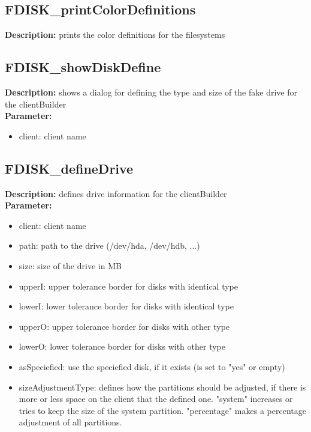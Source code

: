 \subsection{FDISK\_printColorDefinitions}
\textbf{Description:} prints the color definitions for the filesystems\\

\subsection{FDISK\_showDiskDefine}
\textbf{Description:} shows a dialog for defining the type and size of the fake drive for the clientBuilder\\
\textbf{Parameter:}
\begin{itemize}
\item client: client name
\end{itemize}

\subsection{FDISK\_defineDrive}
\textbf{Description:} defines drive information for the clientBuilder\\
\textbf{Parameter:}
\begin{itemize}
\item client: client name
\item path: path to the drive (/dev/hda, /dev/hdb, ...)
\item size: size of the drive in MB
\item upperI: upper tolerance border for disks with identical type
\item lowerI: lower tolerance border for disks with identical type
\item upperO: upper tolerance border for disks with other type
\item lowerO: lower tolerance border for disks with other type
\item asSpeciefied: use the speciefied disk, if it exists (is set to "yes" or empty)
\item sizeAdjustmentType: defines how the partitions should be adjusted, if there is more or less space on the client that the defined one. "system" increases or tries to keep the size of the system partition. "percentage" makes a percentage adjustment of all partitions.
\end{itemize}

